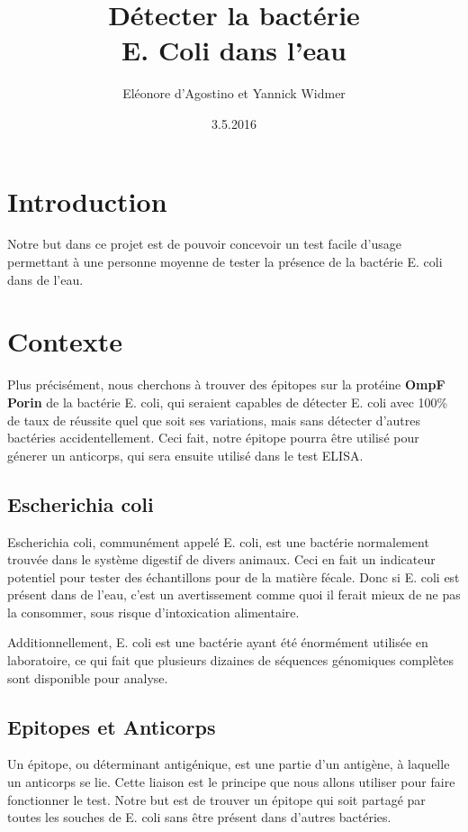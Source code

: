 \documentclass{article}
\title{Détecter la bactérie\\ {\huge E. Coli} dans l'eau}
\date{3.5.2016}
\author{Eléonore d'Agostino et Yannick Widmer}
\begin{document}
  \maketitle
  \tableofcontents
  \newpage
  
  \section{Introduction}
    Notre but dans ce projet est de pouvoir concevoir un test facile d'usage permettant à une personne moyenne de tester la présence de la bactérie E. coli dans de l'eau.
    
  \section{Contexte}
    Plus précisément, nous cherchons à trouver des épitopes sur la protéine \textbf{OmpF Porin} de la bactérie E. coli, qui seraient capables de détecter E. coli avec 100\% de taux de réussite quel que soit ses variations, mais sans détecter d'autres bactéries accidentellement. Ceci fait, notre épitope pourra être utilisé pour génerer un anticorps, qui sera ensuite utilisé dans le test ELISA.
    
    \subsection{Escherichia coli}
      Escherichia coli, communément appelé E. coli, est une bactérie normalement trouvée dans le système digestif de divers animaux. Ceci en fait un indicateur potentiel pour tester des échantillons pour de la matière fécale. Donc si E. coli est présent dans de l'eau, c'est un avertissement comme quoi il ferait mieux de ne pas la consommer, sous risque d'intoxication alimentaire.
      
      Additionnellement, E. coli est une bactérie ayant été énormément utilisée en laboratoire, ce qui fait que plusieurs dizaines de séquences génomiques complètes sont disponible pour analyse.
      
    \subsection{Epitopes et Anticorps}
      Un épitope, ou déterminant antigénique, est une partie d'un antigène, à laquelle un anticorps se lie. Cette liaison est le principe que nous allons utiliser pour faire fonctionner le test. Notre but est de trouver un épitope qui soit partagé par toutes les souches de E. coli sans être présent dans d'autres bactéries.
      
\end{document}
